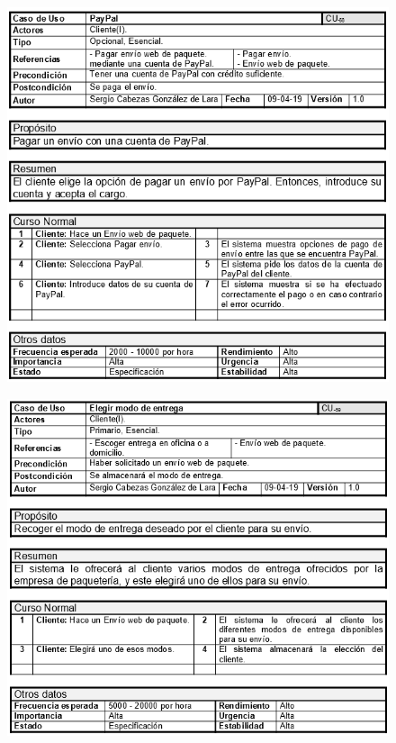 \begin{figure}[H]
	\centering
	\includegraphics[width=16cm]{58}
\end{figure}
\begin{figure}[H]
	\centering
	\includegraphics[width=16cm]{59}
\end{figure}
